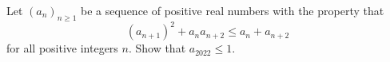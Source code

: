 Let $(a_n)_{n\geq 1}$ be a sequence of positive real numbers with the property that
\[
(a_{n+1})^2 + a_n a_{n+2} \leq a_n + a_{n+2}
\]
for all positive integers $n$. Show that $a_{2022} \leq 1$.
